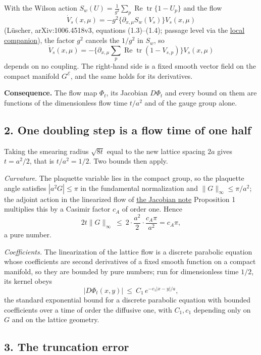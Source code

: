 \documentclass[11pt,a4paper]{article}
\begin{document}
With the Wilson action
\(S_w(U)=\frac1{g^2}\sum_p\operatorname{Re}\operatorname{tr}\{1-U_p\}\)
and the flow
\[\dot V_s(x,\mu)=-g^2\big\{\partial_{x,\mu}S_w(V_s)\big\}V_s(x,\mu)\]
(Lüscher, arXiv:1006.4518v3, equations (1.3)--(1.4); passage level via
the \href{../docs/Luscher_WilsonFlow_1006.4518v3.md}{local companion}),
the factor \(g^2\) cancels the \(1/g^2\) in \(S_w\), so
\[\dot V_s(x,\mu)=-\big\{\partial_{x,\mu}\textstyle\sum_p\operatorname{Re}\operatorname{tr}(1-V_{s,p})\big\}V_s(x,\mu)\]
depends on no coupling. The right-hand side is a fixed smooth vector
field on the compact manifold \(G^{\mathcal E}\), and the same holds for
its derivatives.

\textbf{Consequence.} The flow map \(\Phi_t\), its Jacobian \(D\Phi_t\)
and every bound on them are functions of the dimensionless flow time
\(t/a^2\) and of the gauge group alone.

\hypertarget{one-doubling-step-is-a-flow-time-of-one-half}{%
\subsection{2. One doubling step is a flow time of one
half}\label{one-doubling-step-is-a-flow-time-of-one-half}}

Taking the smearing radius \(\sqrt{8t}\) equal to the new lattice
spacing \(2a\) gives \(t=a^2/2\), that is \(t/a^2=1/2\). Two bounds then
apply.

\emph{Curvature.} The plaquette variable lies in the compact group, so
the plaquette angle satisfies \(|a^2G|\le\pi\) in the fundamental
normalization and \(\|G\|_\infty\le\pi/a^2\); the adjoint action in the
linearized flow of \href{flow-jacobian-truncation-error.md}{the Jacobian
note} Proposition 1 multiplies this by a Casimir factor \(c_A\) of order
one. Hence
\[2t\|G\|_\infty\ \le\ 2\cdot\frac{a^2}{2}\cdot\frac{c_A\pi}{a^2}=c_A\pi,\]
a pure number.

\emph{Coefficients.} The linearization of the lattice flow is a discrete
parabolic equation whose coefficients are second derivatives of a fixed
smooth function on a compact manifold, so they are bounded by pure
numbers; run for dimensionless time \(1/2\), its kernel obeys
\[\big|D\Phi_t(x,y)\big|\ \le\ C_1\,e^{-c_1|x-y|/a},\] the standard
exponential bound for a discrete parabolic equation with bounded
coefficients over a time of order the diffusive one, with \(C_1,c_1\)
depending only on \(G\) and on the lattice geometry.

\hypertarget{the-truncation-error}{%
\subsection{3. The truncation error}\label{the-truncation-error}}
\end{document}
